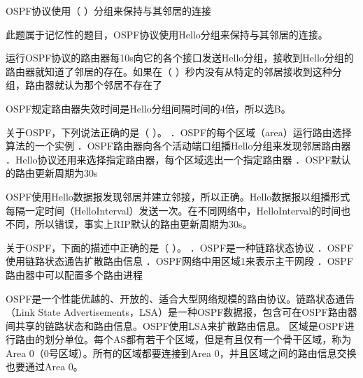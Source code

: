\question OSPF协议使用（ ）分组来保持与其邻居的连接
\par{}
\begin{solution}此题属于记忆性的题目，OSPF协议使用Hello分组来保持与其邻居的连接。
\end{solution}
\question 运行OSPF协议的路由器每10s向它的各个接口发送Hello分组，接收到Hello分组的路由器就知道了邻居的存在。如果在（
）秒内没有从特定的邻居接收到这种分组，路由器就认为那个邻居不存在了
\par{}
\begin{solution}OSPF规定路由器失效时间是Hello分组间隔时间的4倍，所以选B。
\end{solution}
\question 关于OSPF，下列说法正确的是（ ）。
．OSPF的每个区域（area）运行路由选择算法的一个实例
．OSPF路由器向各个活动端口组播Hello分组来发现邻居路由器
．Hello协议还用来选择指定路由器，每个区域选出一个指定路由器
．OSPF默认的路由更新周期为30s
\par{}
\begin{solution}OSPF使用Hello数据报发现邻居并建立邻接，所以正确。Hello数据报以组播形式每隔一定时间（HelloInterval）发送一次。在不同网络中，HelloInterval的时间也不同，所以错误，事实上RIP默认的路由更新周期为30s。
\end{solution}
\question 关于OSPF，下面的描述中正确的是（ ）。 ．OSPF是一种链路状态协议
．OSPF使用链路状态通告扩散路由信息 ．OSPF网络中用区域1来表示主干网段
．OSPF路由器中可以配置多个路由进程
\par{}
\begin{solution}OSPF是一个性能优越的、开放的、适合大型网络规模的路由协议。链路状态通告（Link
State
Advertisements，LSA）是一种OSPF数据报，包含可在OSPF路由器间共享的链路状态和路由信息。OSPF使用LSA来扩散路由信息。
区域是OSPF进行路由的划分单位。每个AS都有若干个区域，但是有且仅有一个骨干区域，称为Area
0（0号区域）。所有的区域都要连接到Area
0，并且区域之间的路由信息交换也要通过Area 0。
\end{solution}
